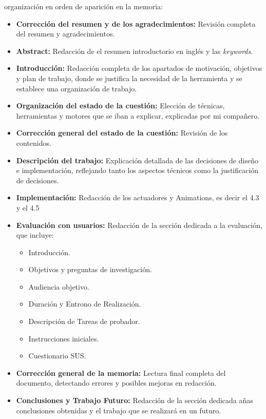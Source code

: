 organización en orden de aparición en la memoria:
\begin{itemize}
  \item \textbf{Corrección del resumen y de los agradecimientos:} Revisión completa del resumen y agradecimientos.
  \item \textbf{Abstract:} Redacción de el resumen introductorio en inglés y las \textit{keywords}.
  \item \textbf{Introducción:} Redacción completa de los apartados de motivación, objetivos y plan de trabajo, donde se justifica la necesidad de la herramienta y se establece una organización de trabajo.
  \item \textbf{Organización del estado de la cuestión:} Elección de técnicas, herramientas y motores que se iban a explicar, explicadas por mi compañero.
  \item \textbf{Corrección general del estado de la cuestión:} Revisión de los contenidos.
  \item \textbf{Descripción del trabajo:} Explicación detallada de las decisiones de diseño e implementación, reflejando tanto los aspectos técnicos como la justificación de decisiones.
  \item \textbf{Implementación:} Redacción de los actuadores y Animations, es decir el 4.3 y el 4.5
  \item \textbf{Evaluación con usuarios:} Redacción de la sección dedicada a la evaluación, que incluye:
  \begin{itemize}
    \item Introducción.
    \item Objetivos y preguntas de investigación.
    \item Audiencia objetivo.
    \item Duración y Entrono de Realización.
    \item Descripción de Tareas de probador.
    \item Instrucciones iniciales.
    \item Cuestionario SUS.
  \end{itemize}

  \item \textbf{Corrección general de la memoria:} Lectura final completa del documento, detectando errores  y posibles mejoras en redacción.
  \item \textbf{Conclusiones y Trabajo Futuro:} Redacción de la sección dedicada añas conclusiones obtenidas y el trabajo que se realizará en un futuro.
\end{itemize}

